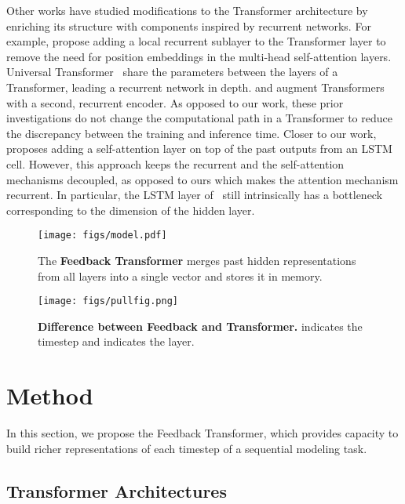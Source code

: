 \documentclass{article} \usepackage{iclr2021_conference}
\begin{document}
Other works have studied modifications to the Transformer architecture by enriching its structure with components inspired by recurrent networks. 
For example, \citet{wang2019r} propose adding a local recurrent sublayer to the Transformer layer to remove the need for position embeddings in the multi-head self-attention layers.
Universal Transformer~\citep{dehghani2018universal} share the parameters between the layers of a Transformer, leading a recurrent network in depth.
\citet{hao2019modeling} and \citet{chen2018best} augment Transformers with a second, recurrent encoder. 
As opposed to our work, these prior investigations do not change the computational path in a Transformer to reduce the discrepancy between the training and inference time.
Closer to our work,~\citet{merity2019single} proposes adding a self-attention layer on top of the past outputs from an LSTM cell.
However, this approach keeps the recurrent and the self-attention mechanisms decoupled, as opposed to ours which makes the attention mechanism recurrent.
In particular, the LSTM layer of~\citet{merity2019single} still intrinsically has a bottleneck corresponding to the dimension of the hidden layer.
 
\begin{figure}[t]
	\centering
	\begin{minipage}[t]{0.47\textwidth}
		\centering
		\texttt{[image: figs/model.pdf]}
		\caption{The \textbf{Feedback Transformer} merges past hidden representations from all layers into a single vector and stores it in memory.}
		\label{fig:pullfig}
	\end{minipage}
	\hfill
	\begin{minipage}[t]{0.47\textwidth}
		\centering
		\texttt{[image: figs/pullfig.png]}
		\caption{\textbf{Difference between Feedback and Transformer.}   indicates the timestep and  indicates the layer.}
		\label{fig:summary}
	\end{minipage}
\end{figure}


\section{Method}
\label{sec:method}

In this section, we propose the Feedback Transformer, which provides capacity to build richer representations of each timestep  of a sequential modeling task.

\subsection{Transformer Architectures}
\end{document}
